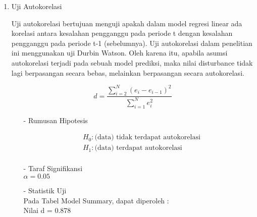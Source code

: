 \begin{enumerate}
\begin{enumerate}
    \item Uji Autokorelasi \\
    \begin{sloppypar}
    Uji autokorelasi bertujuan menguji apakah dalam model regresi linear ada korelasi antara kesalahan pengganggu pada periode t dengan kesalahan pengganggu pada periode t-1 (sebelumnya). Uji autokorelasi dalam penelitian ini menggunakan uji Durbin Watson. Oleh karena itu, apabila asumsi autokorelasi terjadi pada sebuah model prediksi, maka nilai disturbance tidak lagi berpasangan secara bebas, melainkan berpasangan secara autokorelasi.
    \end{sloppypar}
    \begin{equation*}
        d = \frac{\sum_{i=2}^N (e_i - e_{i-1})^2}{\sum_{i=1}^N e_i^2}
    \end{equation*}
    \begin{test}{
        \begin{enumerate}
        \item[-] Rumusan Hipotesis \\
        \begin{fleqn}[\parindent]
            \begin{equation*}
            \begin{split}
            &H_0 : \text{(data) tidak terdapat autokorelasi} \\ 
            &H_1 : \text{(data) terdapat autokorelasi} \\
            \end{split}
            \end{equation*}
        \end{fleqn}
    
        \item[-] Taraf Signifikansi \\
        $\alpha = 0.05$
    
        \item[-] Statistik Uji \\
        Pada Tabel Model Summary, dapat diperoleh : \\
        Nilai d = 0.878
    

\end{enumerate}}
\end{test}
\end{enumerate}
\end{enumerate}
